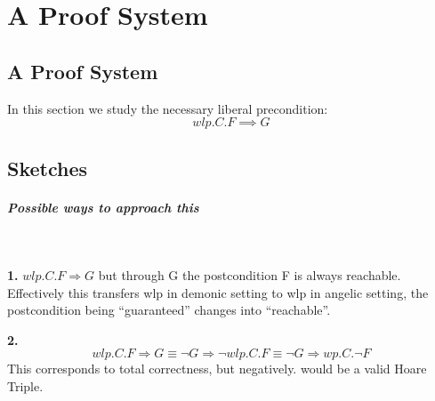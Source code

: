 \chapter{A Proof System}\label{ch:system} %

\section{A Proof System}
In this section we study the necessary liberal precondition: 
$$wlp.C.F\implies G$$


\section{Sketches} 

\paragraph{Possible ways to approach this}\ 

\textbf{1.} $wlp.C.F \Longrightarrow G $ but through G the postcondition F is always reachable. 
Effectively this transfers wlp in demonic setting to wlp in angelic setting, the postcondition being ``guaranteed'' changes into ``reachable''. 

\textbf{2.}$$wlp.C.F \Longrightarrow G \equiv \neg G \Longrightarrow \neg wlp.C.F \equiv \neg G \Longrightarrow  wp.C.\neg F $$ 
This corresponds to total correctness, but negatively. 
 would be a valid Hoare Triple. 

